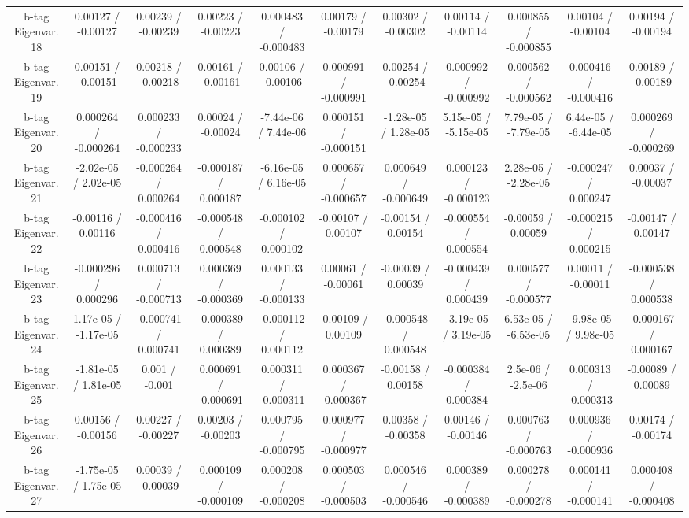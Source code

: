 \begin{table}[htbp]
\begin{center}
\begin{tabular}{|c|c|c|c|c|c|c|c|c|c|c|}
  b-tag Eigenvar. 18 & 0.00127 / -0.00127 & 0.00239 / -0.00239 & 0.00223 / -0.00223 & 0.000483 / -0.000483 & 0.00179 / -0.00179 & 0.00302 / -0.00302 & 0.00114 / -0.00114 & 0.000855 / -0.000855 & 0.00104 / -0.00104 & 0.00194 / -0.00194 \\ 
  b-tag Eigenvar. 19 & 0.00151 / -0.00151 & 0.00218 / -0.00218 & 0.00161 / -0.00161 & 0.00106 / -0.00106 & 0.000991 / -0.000991 & 0.00254 / -0.00254 & 0.000992 / -0.000992 & 0.000562 / -0.000562 & 0.000416 / -0.000416 & 0.00189 / -0.00189 \\ 
  b-tag Eigenvar. 20 & 0.000264 / -0.000264 & 0.000233 / -0.000233 & 0.00024 / -0.00024 & -7.44e-06 / 7.44e-06 & 0.000151 / -0.000151 & -1.28e-05 / 1.28e-05 & 5.15e-05 / -5.15e-05 & 7.79e-05 / -7.79e-05 & 6.44e-05 / -6.44e-05 & 0.000269 / -0.000269 \\ 
  b-tag Eigenvar. 21 & -2.02e-05 / 2.02e-05 & -0.000264 / 0.000264 & -0.000187 / 0.000187 & -6.16e-05 / 6.16e-05 & 0.000657 / -0.000657 & 0.000649 / -0.000649 & 0.000123 / -0.000123 & 2.28e-05 / -2.28e-05 & -0.000247 / 0.000247 & 0.00037 / -0.00037 \\ 
  b-tag Eigenvar. 22 & -0.00116 / 0.00116 & -0.000416 / 0.000416 & -0.000548 / 0.000548 & -0.000102 / 0.000102 & -0.00107 / 0.00107 & -0.00154 / 0.00154 & -0.000554 / 0.000554 & -0.00059 / 0.00059 & -0.000215 / 0.000215 & -0.00147 / 0.00147 \\ 
  b-tag Eigenvar. 23 & -0.000296 / 0.000296 & 0.000713 / -0.000713 & 0.000369 / -0.000369 & 0.000133 / -0.000133 & 0.00061 / -0.00061 & -0.00039 / 0.00039 & -0.000439 / 0.000439 & 0.000577 / -0.000577 & 0.00011 / -0.00011 & -0.000538 / 0.000538 \\ 
  b-tag Eigenvar. 24 & 1.17e-05 / -1.17e-05 & -0.000741 / 0.000741 & -0.000389 / 0.000389 & -0.000112 / 0.000112 & -0.00109 / 0.00109 & -0.000548 / 0.000548 & -3.19e-05 / 3.19e-05 & 6.53e-05 / -6.53e-05 & -9.98e-05 / 9.98e-05 & -0.000167 / 0.000167 \\ 
  b-tag Eigenvar. 25 & -1.81e-05 / 1.81e-05 & 0.001 / -0.001 & 0.000691 / -0.000691 & 0.000311 / -0.000311 & 0.000367 / -0.000367 & -0.00158 / 0.00158 & -0.000384 / 0.000384 & 2.5e-06 / -2.5e-06 & 0.000313 / -0.000313 & -0.00089 / 0.00089 \\ 
  b-tag Eigenvar. 26 & 0.00156 / -0.00156 & 0.00227 / -0.00227 & 0.00203 / -0.00203 & 0.000795 / -0.000795 & 0.000977 / -0.000977 & 0.00358 / -0.00358 & 0.00146 / -0.00146 & 0.000763 / -0.000763 & 0.000936 / -0.000936 & 0.00174 / -0.00174 \\ 
  b-tag Eigenvar. 27 & -1.75e-05 / 1.75e-05 & 0.00039 / -0.00039 & 0.000109 / -0.000109 & 0.000208 / -0.000208 & 0.000503 / -0.000503 & 0.000546 / -0.000546 & 0.000389 / -0.000389 & 0.000278 / -0.000278 & 0.000141 / -0.000141 & 0.000408 / -0.000408 \\ 

\end{tabular}
\end{center}
\end{table}

